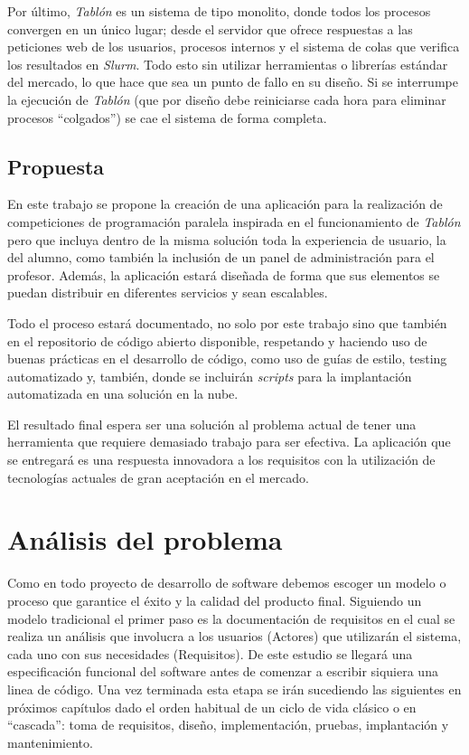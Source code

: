 \documentclass[11pt,spanish,listoffigures,listoftables]{tfgetsinf}
\begin{document}
Por último, \textit{Tablón} es un sistema de tipo monolito, donde todos los procesos convergen en un único lugar; desde el servidor que ofrece respuestas a las peticiones web de los usuarios, procesos internos y el sistema de colas que verifica los resultados en \textit{Slurm}. Todo esto sin utilizar herramientas o librerías estándar del mercado, lo que hace que sea un punto de fallo en su diseño. Si se interrumpe la ejecución de \textit{Tablón} (que por diseño debe reiniciarse cada hora para eliminar procesos ``colgados'') se cae el sistema de forma completa.

\section{Propuesta}

En este trabajo se propone la creación de una aplicación para la realización de competiciones de programación paralela inspirada en el funcionamiento de \textit{Tablón} pero que incluya dentro de la misma solución toda la experiencia de usuario, la del alumno, como también la inclusión de un panel de administración para el profesor. Además, la aplicación estará diseñada de forma que sus elementos se puedan distribuir en diferentes servicios y sean escalables. 

Todo el proceso estará documentado, no solo por este trabajo sino que también en el repositorio de código abierto disponible, respetando y haciendo uso de buenas prácticas en el desarrollo de código, como uso de guías de estilo, testing automatizado y, también, donde se incluirán \textit{scripts} para la implantación automatizada en una solución en la nube.

El resultado final espera ser una solución al problema actual de tener una herramienta que requiere demasiado trabajo para ser efectiva. La aplicación que se entregará es una respuesta innovadora a los requisitos con la utilización de tecnologías actuales de gran aceptación en el mercado.

\chapter{Análisis del problema}

Como en todo proyecto de desarrollo de software debemos escoger un modelo o proceso que garantice el éxito y la calidad del producto final. Siguiendo un modelo tradicional el primer paso es la documentación de requisitos \cite{libingreq} en el cual se realiza un análisis que involucra a los usuarios (Actores) que utilizarán el sistema, cada uno con sus necesidades (Requisitos). De este estudio se llegará una especificación funcional del software antes de comenzar a escribir siquiera una linea de código. Una vez terminada esta etapa se irán sucediendo las siguientes en próximos capítulos dado el orden habitual de un ciclo de vida clásico \cite{libingsoft} o en ``cascada'': toma de requisitos, diseño, implementación, pruebas, implantación y mantenimiento.
\end{document}
